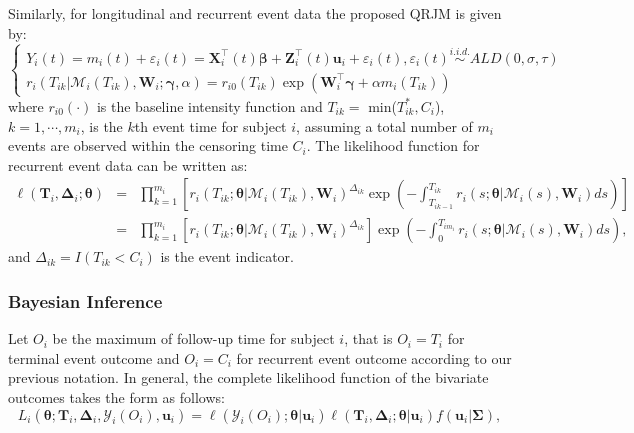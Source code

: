 Similarly, for longitudinal and recurrent event data the proposed QRJM is given by:
\begin{equation*}\label{eqn:joint_recurrent}
\left\{
\begin{array}{l}
Y_{i}(t) = m_{i}(t) + \varepsilon_{i}(t) = {\boldsymbol X}_{i}^{\top}(t)\boldsymbol{\beta} + {\boldsymbol Z}_{i}^{\top}(t){\boldsymbol u}_i + \varepsilon_{i}(t), \varepsilon_{i}(t) \overset{i.i.d.}\sim ALD(0, \sigma, \tau)\\
r_i(T_{ik}|\mathcal{M}_{i}(T_{ik}), {\boldsymbol W}_i;  \boldsymbol{\gamma}, \alpha) = r_{i0}(T_{ik})\exp({\boldsymbol W}_i^{\top}\boldsymbol{\gamma} + \alpha m_{i}(T_{ik}))
\end{array}
\right.
\end{equation*}
where $r_{i0}(\cdot)$ is the baseline intensity function and $T_{ik}= $ min($T_{ik}^*, C_i$), $k=1,\cdots, m_i$, is the $k$th event time for subject $i$, assuming a total number of $m_i$ events are observed within the censoring time $C_i$. The likelihood function for recurrent event data can be written as:
{\small
\begin{eqnarray}\label{eqn:bak_lik_rec}
\ell({\boldsymbol T}_i, \boldsymbol{\Delta}_{i};\boldsymbol{\theta})&=& \nonumber \prod_{k=1}^{m_i}\left[r_i(T_{ik};\boldsymbol{\theta}|\mathcal{M}_{i}(T_{ik}), \boldsymbol{W}_i)^{\Delta_{ik}}\exp\left(-\int_{T_{ik-1}}^{T_{ik}}r_i(s;\boldsymbol{\theta}|\mathcal{M}_{i}(s), \boldsymbol{W}_i)ds\right)\right]\\
&=& \prod_{k=1}^{m_i}\left[r_i(T_{ik};\boldsymbol{\theta}|\mathcal{M}_{i}(T_{ik}), \boldsymbol{W}_i)^{\Delta_{ik}}\right]\exp\left(-\int_0^{T_{im_i}}r_i(s;\boldsymbol{\theta}|\mathcal{M}_{i}(s), \boldsymbol{W}_i)ds\right),
\end{eqnarray}
}
and $\Delta_{ik} = I(T_{ik} < C_i)$ is the event indicator.



\subsubsection{Bayesian Inference}\label{sec:bak_inference}
Let $O_i$ be the maximum of follow-up time for subject $i$, that is $O_i = T_i$ for terminal event outcome and $O_i = C_i$ for recurrent event outcome according to our previous notation. In general, the complete likelihood function of the bivariate outcomes takes the form as follows:
\begin{equation}\label{eqn:bak_full_lik}
L_i(\boldsymbol{\theta};{\boldsymbol T}_i, \boldsymbol{\Delta}_i, \mathcal{Y}_{i}(O_i), \boldsymbol{u}_i) = \ell(\mathcal{Y}_{i}(O_i); \boldsymbol{\theta}|\boldsymbol{u}_i)\ell({\boldsymbol T}_i, {\boldsymbol\Delta}_i; \boldsymbol{\theta}|\boldsymbol{u}_i)f(\boldsymbol{u}_i|\boldsymbol{\Sigma}),
\end{equation}

